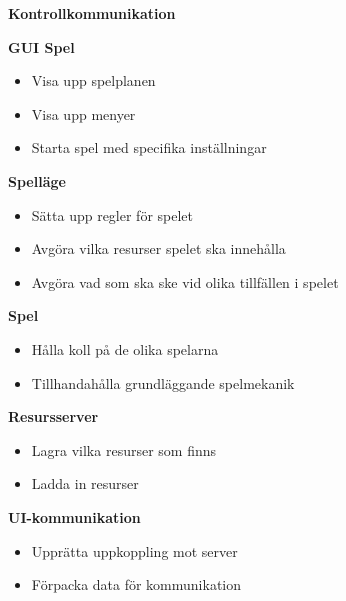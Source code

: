 \begin{labeling}{\small{\textbf{Kontrollkommunikation}}}
    \item [\small{\textbf{GUI Spel}}]
        \begin{itemize}
            \item Visa upp spelplanen
            \item Visa upp menyer
            \item Starta spel med specifika inställningar
            \newline
        \end{itemize}

    \item [\small{\textbf{Spelläge}}]
        \begin{itemize}
            \item Sätta upp regler för spelet
            \item Avgöra vilka resurser spelet ska innehålla
            \item Avgöra vad som ska ske vid olika tillfällen i spelet
            \newline
        \end{itemize}

    \item [\small{\textbf{Spel}}]
        \begin{itemize}
            \item Hålla koll på de olika spelarna
            \item Tillhandahålla grundläggande spelmekanik
            \newline
        \end{itemize}

    \item [\small{\textbf{Resursserver}}]
        \begin{itemize}
            \item Lagra vilka resurser som finns
            \item Ladda in resurser
            \newline
        \end{itemize}

    \item [\small{\textbf{UI-kommunikation}}]
        \begin{itemize}
            \item Upprätta uppkoppling mot server
            \item Förpacka data för kommunikation
            \newline
        \end{itemize}


\end{labeling}
